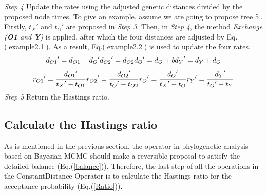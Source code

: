 \documentclass{bmcart}
\begin{document}
\emph{Step 4}  Update the rates using the adjusted genetic distances divided by the proposed node times. To give an example, assume we are going to propose tree \textcircled5. Firstly, ${t_X}'$ and ${t_O}'$ are proposed in \emph{Step 3}.  Then, in \emph{Step 4}, the method \textit{Exchange (\textbf{O1} and \textbf{Y})} is applied, after which the four distances are adjusted by Eq.(\ref{example2.1}). As a result, Eq.(\ref{example2.2}) is used to update the four rates.
\begin{equation}\label{example2.1}
{d_{O1}}' = {d_{O1}} - {d_O}'  \\
{d_{O2}}' = {d_{O2}}  \\
{d_O}' = {d_O} + b  \\
{d_Y}' = {d_Y} + {d_O} 
\end{equation}
\begin{equation}\label{example2.2}
{r_{O1}}' = \frac{{{d_{O1}}'}}{{{t_X}' - {t_{O1}}}} \\
{r_{O2}}' = \frac{{{d_{O2}}'}}{{{t_O}' - {t_{O2}}}} \\
{r_O}' = \frac{{{d_O}'}}{{{t_X}' - {t_O}}} \\
{r_Y}' = \frac{{{d_Y}'}}{{{t_O}' - {t_Y}}} 
\end{equation}
\emph{Step 5} Return the Hastings ratio.

\subsection*{Calculate the Hastings ratio}
As is mentioned in the previous section, the operator in phylogenetic analysis based on Bayesian MCMC should make a reversible proposal to satisfy the detailed balance (Eq.(\ref{balance})). Therefore, the last step of all the operations in the ConstantDistance Operator is to calculate the Hastings ratio for the acceptance probability (Eq.(\ref{Ratio})). 
\end{document}
